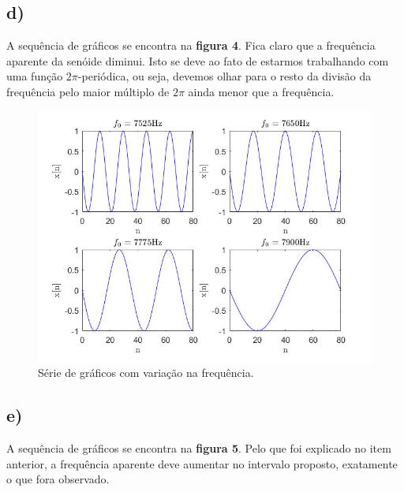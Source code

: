 \documentclass[a4paper, 12pt]{article}
\begin{document}
\subsection{d)}

A sequência de gráficos se encontra na \textbf{figura 4}. Fica claro que a frequência aparente da senóide diminui. Isto se deve ao fato de estarmos trabalhando com uma função $2\pi$-periódica, ou seja, devemos olhar para o resto da divisão da frequência pelo maior múltiplo de $2\pi$ ainda menor que a frequência.



\begin{figure}[H]
	\centering
	\includegraphics[scale=0.5]{../Imagens/ex1/d.jpg} 
	\caption{Série de gráficos com variação na frequência.}
	\label{fig:1d}
\end{figure}

\subsection{e)}

A sequência de gráficos se encontra na \textbf{figura 5}. Pelo que foi explicado no item anterior, a frequência aparente deve aumentar no intervalo proposto, exatamente o que fora observado. 


\end{document}
